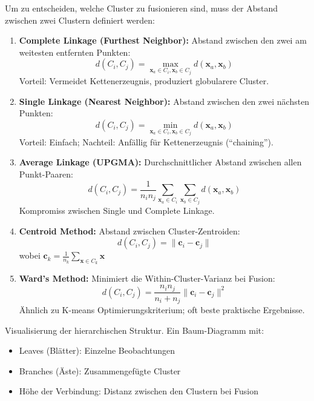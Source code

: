 Um zu entscheiden, welche Cluster zu fusionieren sind, muss der Abstand zwischen zwei Clustern definiert werden:

\begin{enumerate}[leftmargin=1.5em]
    \item \textbf{Complete Linkage (Furthest Neighbor):} Abstand zwischen den zwei am weitesten entfernten Punkten:
    $$d(C_i, C_j) = \max_{\mathbf{x}_a \in C_i, \mathbf{x}_b \in C_j} d(\mathbf{x}_a, \mathbf{x}_b)$$
    Vorteil: Vermeidet Kettenerzeugnis, produziert globularere Cluster.
    
    \item \textbf{Single Linkage (Nearest Neighbor):} Abstand zwischen den zwei nächsten Punkten:
    $$d(C_i, C_j) = \min_{\mathbf{x}_a \in C_i, \mathbf{x}_b \in C_j} d(\mathbf{x}_a, \mathbf{x}_b)$$
    Vorteil: Einfach; Nachteil: Anfällig für Kettenerzeugnis (``chaining'').
    
    \item \textbf{Average Linkage (UPGMA):} Durchschnittlicher Abstand zwischen allen Punkt-Paaren:
    $$d(C_i, C_j) = \frac{1}{n_i n_j} \sum_{\mathbf{x}_a \in C_i} \sum_{\mathbf{x}_b \in C_j} d(\mathbf{x}_a, \mathbf{x}_b)$$
    Kompromiss zwischen Single und Complete Linkage.
    
    \item \textbf{Centroid Method:} Abstand zwischen Cluster-Zentroiden:
    $$d(C_i, C_j) = \|\mathbf{c}_i - \mathbf{c}_j\|$$
    wobei $\mathbf{c}_k = \frac{1}{n_k} \sum_{\mathbf{x} \in C_k} \mathbf{x}$
    
    \item \textbf{Ward's Method:} Minimiert die Within-Cluster-Varianz bei Fusion:
    $$d(C_i, C_j) = \frac{n_i n_j}{n_i + n_j} \|\mathbf{c}_i - \mathbf{c}_j\|^2$$
    Ähnlich zu K-means Optimierungskriterium; oft beste praktische Ergebnisse.
\end{enumerate}

Visualisierung der hierarchischen Struktur. Ein Baum-Diagramm mit:
\begin{itemize}[leftmargin=1.5em]
    \item Leaves (Blätter): Einzelne Beobachtungen
    \item Branches (Äste): Zusammengefügte Cluster
    \item Höhe der Verbindung: Distanz zwischen den Clustern bei Fusion
\end{itemize}

